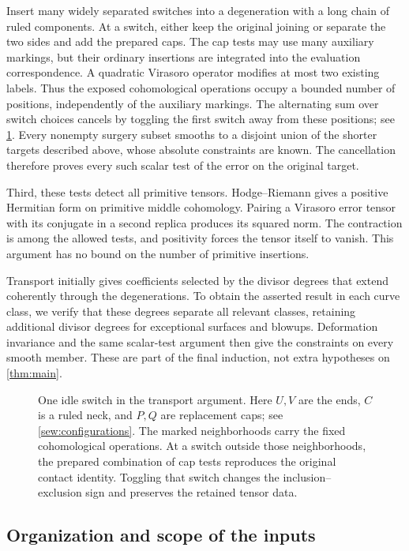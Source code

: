 Insert many widely separated switches into a degeneration with a long chain of ruled components. At a switch, either keep the original joining or separate the two sides and add the prepared caps. The cap tests may use many auxiliary markings, but their ordinary insertions are integrated into the evaluation correspondence. A quadratic Virasoro operator modifies at most two existing labels. Thus the exposed cohomological operations occupy a bounded number of positions, independently of the auxiliary markings. The alternating sum over switch choices cancels by toggling the first switch away from these positions; see \cref{fig:sewing}. Every nonempty surgery subset smooths to a disjoint union of the shorter targets described above, whose absolute constraints are known. The cancellation therefore proves every such scalar test of the error on the original target.

Third, these tests detect all primitive tensors. Hodge--Riemann gives a positive Hermitian form on primitive middle cohomology. Pairing a Virasoro error tensor with its conjugate in a second replica produces its squared norm. The contraction is among the allowed tests, and positivity forces the tensor itself to vanish. This argument has no bound on the number of primitive insertions.

Transport initially gives coefficients selected by the divisor degrees that extend coherently through the degenerations. To obtain the asserted result in each curve class, we verify that these degrees separate all relevant classes, retaining additional divisor degrees for exceptional surfaces and blowups. Deformation invariance and the same scalar-test argument then give the constraints on every smooth member. These are part of the final induction, not extra hypotheses on \cref{thm:main}.

\begin{figure}[ht]
\centering

\caption{One idle switch in the transport argument. Here \(U,V\) are the ends, \(C\) is a ruled neck, and \(P,Q\) are replacement caps; see \cref{sew:configurations}. The marked neighborhoods carry the fixed cohomological operations. At a switch outside those neighborhoods, the prepared combination of cap tests reproduces the original contact identity. Toggling that switch changes the inclusion--exclusion sign and preserves the retained tensor data.}
\label{fig:sewing}
\end{figure}

\subsection{Organization and scope of the inputs}

